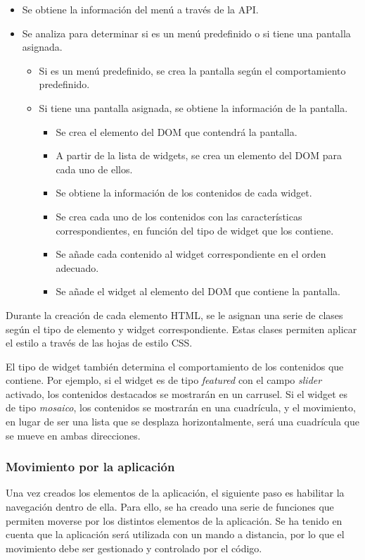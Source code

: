 \begin{itemize}
    \item Se obtiene la información del menú a través de la API.
    \item Se analiza para determinar si es un menú predefinido o si tiene una pantalla asignada. 
    \begin{itemize}
        \item Si es un menú predefinido, se crea la pantalla según el comportamiento predefinido.
        \item Si tiene una pantalla asignada, se obtiene la información de la pantalla. 
        \begin{itemize}
            \item Se crea el elemento del DOM que contendrá la pantalla.
            \item A partir de la lista de widgets, se crea un elemento del DOM para cada uno de ellos.
            \item Se obtiene la información de los contenidos de cada widget.
            \item Se crea cada uno de los contenidos con las características correspondientes, en función del tipo de widget que los contiene.
            \item Se añade cada contenido al widget correspondiente en el orden adecuado.
            \item Se añade el widget al elemento del DOM que contiene la pantalla.
        \end{itemize}
    \end{itemize}
\end{itemize}

Durante la creación de cada elemento HTML, se le asignan una serie de clases según el tipo de elemento y widget correspondiente. Estas clases permiten 
aplicar el estilo a través de las hojas de estilo CSS.

El tipo de widget también determina el comportamiento de los contenidos que contiene. Por ejemplo, si el widget es de tipo \textit{featured} con el campo 
\textit{slider} activado, los contenidos destacados se mostrarán en un carrusel. Si el widget es de tipo \textit{mosaico}, los contenidos se mostrarán en 
una cuadrícula, y el movimiento, en lugar de ser una lista que se desplaza horizontalmente, será una cuadrícula que se mueve en ambas direcciones.


\subsubsection{Movimiento por la aplicación}
\label{sec:movimiento_aplicacion}
Una vez creados los elementos de la aplicación, el siguiente paso es habilitar la navegación dentro de ella. Para ello, se ha creado una serie de funciones 
que permiten moverse por los distintos elementos de la aplicación. Se ha tenido en cuenta que la aplicación será utilizada con un mando a distancia, 
por lo que el movimiento debe ser gestionado y controlado por el código.

